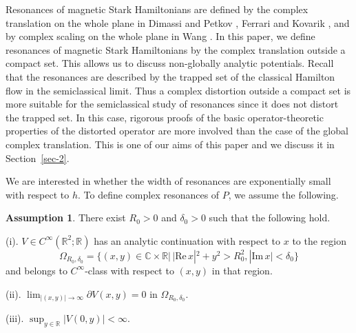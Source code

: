 \documentclass{article}
\theoremstyle{plain}
\theoremstyle{definition}
\newtheorem{asm}{Assumption}
\theoremstyle{remark}
\newcommand{\RR}{\mathbb{R}}
\newcommand{\CC}{\mathbb{C}}
\newcommand{\Cinf}{C^{\infty}}
\newcommand{\RE}{\mathrm{Re}\,}
\newcommand{\IM}{\mathrm{Im}\,}
\begin{document}
Resonances of magnetic Stark Hamiltonians are defined by 
the complex translation on the whole plane in Dimassi and Petkov \cite{DP1}, Ferrari and Kovarik \cite{Fe-Ko0}, 
and by complex scaling on the whole plane in Wang \cite{Wa1}. 
In this paper, we define resonances of magnetic Stark Hamiltonians by 
the complex translation outside a compact set. 
This allows us to discuss non-globally analytic potentials. 
Recall that the resonances are described by the trapped set of the classical Hamilton flow 
in the semiclassical limit. 
Thus a complex distortion outside a compact set is more suitable for the semiclassical study of resonances 
since it does not distort the trapped set. 
In this case, rigorous proofs of the basic operator-theoretic properties of the distorted operator are 
more involved than the case of the global complex translation. 
This is one of our aims of this paper and we discuss it in Section~\ref{sec-2}.  


We are interested in whether the width of resonances are exponentially 
small with respect to $h$.
To define complex resonances of $P$, we assume the following. 
\begin{asm}\label{asm-res}
There exist $R_0>0$ and $\delta_0>0$ such that the following hold. 

\noindent
(i). $V\in \Cinf(\RR^2; \RR)$ has an analytic continuation with respect to $x$ to the region 
\[
\Omega_{R_0, \delta_0}=\{(x, y)\in \CC \times \RR|\,|\RE x|^2+y^2>R_0^2, |\IM x|<\delta_0\}
\]
and belongs to $\Cinf$-class with respect to $(x, y)$ in that region. 

\noindent
\vspace{0.2cm}
(ii).  $\lim_{|(x, y)|\to \infty}\partial V(x, y)=0$ in $\Omega_{R_0, \delta_0}$. 

\noindent
\vspace{0.2cm}
(iii). $\sup_{y\in \RR} |V(0, y)|<\infty$. 

\end{asm}
\end{document}

